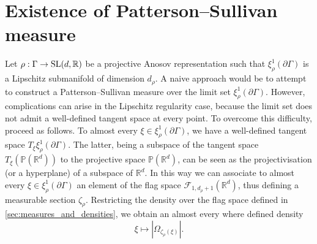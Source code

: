 \documentclass{report}
\begin{document}
\section{Existence of Patterson--Sullivan measure}\label{sec:MeasureExistence}
Let $\rho:\Gamma \to \operatorname{{\mathrm{SL}}}(d, \mathbb R)$ be a projective Anosov representation such that $\xi^1_\rho(\partial \Gamma)$ is a Lipschitz submanifold of dimension $d_\rho$.
A naive approach would be to attempt to construct a Patterson--Sullivan measure over the limit set $\xi^1_\rho(\partial \Gamma)$.
However, complications can arise in the Lipschitz regularity case, because the limit set does not admit a well-defined tangent space at every point.
To overcome this difficulty, proceed as follows.
To almost every $\xi \in \xi_\rho^1(\partial \Gamma)$, we have a well-defined tangent space $T_\xi \xi_\rho^1(\partial \Gamma)$.
The latter, being a subspace of the tangent space $T_\xi(\mathbb P(\mathbb R^d))$ to the projective space $\mathbb P(\mathbb R^d)$, can be seen as the projectivisation (or a hyperplane) of a subspace of $\mathbb R^d$.
In this way we can associate to almost every $\xi \in \xi_\rho^1(\partial \Gamma)$ an element of the flag space $\mathcal F_{1, d_\rho + 1}(\mathbb R^d)$, thus defining a measurable section $\zeta_\rho$.
Restricting the density over the flag space defined in \cref{sec:measures_and_densities}, we obtain an almost every where defined density
\[
    \xi \mapsto |\Omega_{\zeta_\rho(\xi)}|.
\]
\end{document}
